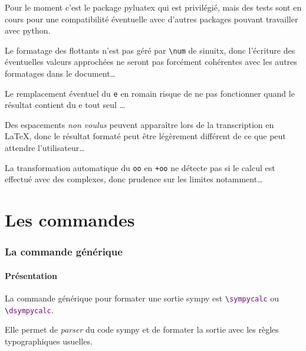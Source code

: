 \documentclass[french,a4paper,11pt]{article}
\begin{document}
\begin{warningblock}
Pour le moment c'est le package \textsf{pyluatex} qui est privilégié, mais des tests sont en cours pour une compatibilité éventuelle avec d'autres packages pouvant travailler avec \textsf{python}.
\end{warningblock}

\begin{warningblock}
Le formatage des flottants n'est pas géré par \texttt{\textbackslash num} de \textsf{sinuitx}, donc l'écriture des éventuelles valeurs approchées ne seront pas forcément cohérentes avec les autres formatages dans le document\ldots

\smallskip

Le remplacement éventuel du \texttt{e} en \textsf{romain} risque de ne pas fonctionner quand le résultat contient du \og e tout seul \fg\ldots

\smallskip

Des espacements \textit{non voulus} peuvent apparaître lors de la transcription en \LaTeX, donc le résultat formaté peut être légèrement différent de ce que peut attendre l'utilisateur\ldots

\smallskip

La transformation automatique du \texttt{oo} en \texttt{+oo} ne détecte pas si le calcul est effectué avec des complexes, donc prudence sur les limites notamment\ldots
\end{warningblock}

\newpage

\part{Les commandes}

\section{La commande générique}

\subsection{Présentation}

\begin{cautionblock}
La commande générique pour formater une sortie \textsf{sympy} est \texttt{\textbackslash \textcolor{purple}{sympycalc}} ou \texttt{\textbackslash \textcolor{purple}{dsympycalc}}.

\smallskip

Elle permet de \textit{parser} du code \textsf{sympy} et de formater la sortie avec les règles typographiques usuelles.
\end{cautionblock}
\end{document}
